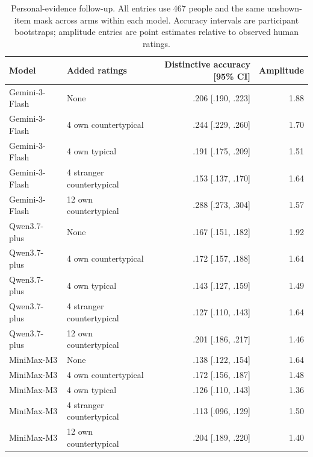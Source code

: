 \begin{table}[!t]
\centering\small
\begin{tabular}{@{}llrr@{}}
\toprule
Model & Added ratings & Distinctive accuracy [95\% CI] & Amplitude\\
\midrule
Gemini-3-Flash & None & .206 [.190, .223] & 1.88\\
Gemini-3-Flash & 4 own countertypical & .244 [.229, .260] & 1.70\\
Gemini-3-Flash & 4 own typical & .191 [.175, .209] & 1.51\\
Gemini-3-Flash & 4 stranger countertypical & .153 [.137, .170] & 1.64\\
Gemini-3-Flash & 12 own countertypical & .288 [.273, .304] & 1.57\\
\midrule
Qwen3.7-plus & None & .167 [.151, .182] & 1.92\\
Qwen3.7-plus & 4 own countertypical & .172 [.157, .188] & 1.64\\
Qwen3.7-plus & 4 own typical & .143 [.127, .159] & 1.49\\
Qwen3.7-plus & 4 stranger countertypical & .127 [.110, .143] & 1.64\\
Qwen3.7-plus & 12 own countertypical & .201 [.186, .217] & 1.46\\
\midrule
MiniMax-M3 & None & .138 [.122, .154] & 1.64\\
MiniMax-M3 & 4 own countertypical & .172 [.156, .187] & 1.48\\
MiniMax-M3 & 4 own typical & .126 [.110, .143] & 1.36\\
MiniMax-M3 & 4 stranger countertypical & .113 [.096, .129] & 1.50\\
MiniMax-M3 & 12 own countertypical & .204 [.189, .220] & 1.40\\
\bottomrule
\end{tabular}
\caption{Personal-evidence follow-up. All entries use 467 people and the same unshown-item mask across arms within each model. Accuracy intervals are participant bootstraps; amplitude entries are point estimates relative to observed human ratings.}
\label{tab:exceptions_full}
\end{table}

